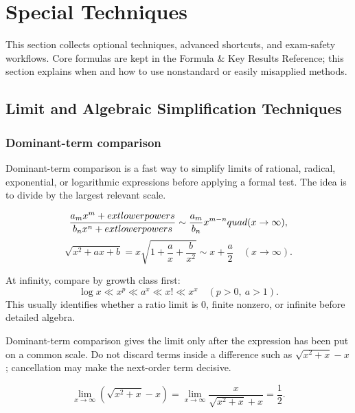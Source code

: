 \section{Special Techniques}

This section collects optional techniques, advanced shortcuts, and exam-safety
workflows.  Core formulas are kept in the Formula \& Key Results Reference;
this section explains when and how to use nonstandard or easily misapplied
methods.

\subsection{Limit and Algebraic Simplification Techniques}

\subsubsection{Dominant-term comparison}
\begin{extension}
Dominant-term comparison is a fast way to simplify limits of rational,
radical, exponential, or logarithmic expressions before applying a formal test.
The idea is to divide by the largest relevant scale.
\end{extension}

\begin{keyformula}[title={Dominant-Term Templates}]
\[
\frac{a_mx^m+	ext{lower powers}}{b_nx^n+	ext{lower powers}}
\sim \frac{a_m}{b_n}x^{m-n}\\quad(x\to\infty),
\]
\[
\sqrt{x^2+ax+b}=x\sqrt{1+\frac{a}{x}+\frac{b}{x^2}}
\sim x+\frac a2\quad(x\to\infty).
\]
\end{keyformula}

\begin{examtip}
At infinity, compare by growth class first:
\[
\log x \ll x^p \ll a^x \ll x! \ll x^x
\quad(p>0,\ a>1).
\]
This usually identifies whether a ratio limit is \(0\), finite nonzero, or
infinite before detailed algebra.
\end{examtip}

\begin{commonmistake}
Dominant-term comparison gives the limit only after the expression has been
put on a common scale.  Do not discard terms inside a difference such as
\(\sqrt{x^2+x}-x\); cancellation may make the next-order term decisive.
\end{commonmistake}

\begin{examplebox}[title={Radical Cancellation}]
\[
\lim_{x\to\infty}\left(\sqrt{x^2+x}-x\right)
=\lim_{x\to\infty}\frac{x}{\sqrt{x^2+x}+x}
=\frac12.
\]
\end{examplebox}

